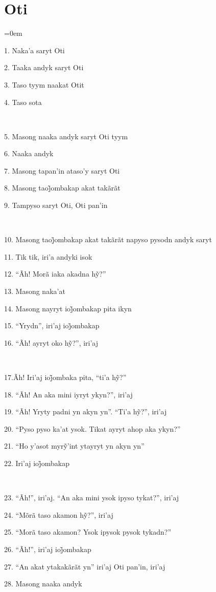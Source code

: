 \chapter*{Oti}\parindent=0em

1. Naka'a saryt Oti

2. Taaka andyk saryt Oti

3. Taso tyym naakat Otit

4. Taso sota

~

5. Masong naaka andyk saryt Oti tyym

6. Naaka andyk

7. Masong tapan'in ataso'y saryt Oti

8. Masong taoj̃ombakap akat takãrãt

9. Tampyso saryt Oti, Oti pan'in

~

10. Masong taoj̃ombakap akat takãrãt napyso pysodn andyk saryt

11. Tik tik, iri'a andyki isok

12. ``Ãh! Morã iaka akadna hỹ?''

13. Masong naka'at

14. Masong nayryt ioj̃ombakap pita ikyn

15. ``Yrydn'', iri’aj ioj̃ombakap

16. ``Ãh! ayryt oko hỹ?'', iri’aj

~

17.Ãh! Iri’aj ioj̃ombaka pita, ``ti’a hỹ?''

18. ``Ãh! An aka mini iyryt ykyn?'', iri'aj

19. ``Ãh! Yryty padni yn akyn yn''. ``Ti’a hỹ?'', iri’aj

20. ``Pyso pyso ka'at ysok. Tikat ayryt ahop aka ykyn?''

21. ``Ho y’asot myrỹ’int ytayryt yn akyn yn''

22. Iri’aj ioj̃ombakap

~

23. ``Ãh!'', iri'aj. ``An aka mini ysok ipyso tykat?'', iri'aj

24. ``Mõrã taso akamon hỹ?'', iri’aj

25. ``Morã taso akamon? Ysok ipysok pysok tykadn?''

26. ``Ãh!'', iri’aj ioj̃ombakap

27. ``An akat ytakakãrãt yn'' iri'aj Oti pan'in, iri'aj

28. Masong naaka andyk

~


